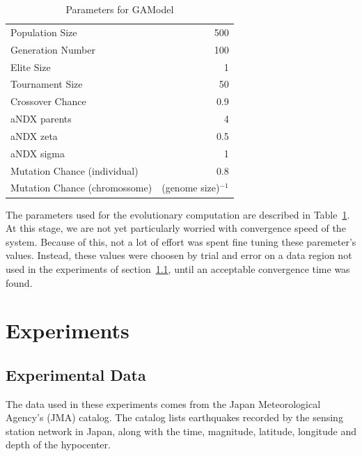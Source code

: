 \documentclass{sig-alternate}
\begin{document}
\begin{table}[!ht]
  \begin{center}
  \begin{tabular}{|l|r|}
    \hline
    Population Size & 500\\
    Generation Number & 100\\
    Elite Size & 1\\
    Tournament Size & 50\\
    Crossover Chance & 0.9\\
    aNDX parents & 4\\
    aNDX zeta & 0.5\\
    aNDX sigma & 1\\
    Mutation Chance (individual) & 0.8\\
    Mutation Chance (chromossome) & (genome size)$^{-1}$\\
    \hline    
  \end{tabular}
  \end{center}
  \caption{Parameters for GAModel}
  \label{GAParameters}
\end{table}

The parameters used for the evolutionary computation are described in
Table~\ref{GAParameters}. At this stage, we are not yet particularly
worried with convergence speed of the system. Because of this, not a
lot of effort was spent fine tuning these paremeter's values. Instead,
these values were choosen by trial and error on a data region not used
in the experiments of section~\ref{data}, until an acceptable
convergence time was found.


\section{Experiments}

\subsection{Experimental Data}\label{data}

The data used in these experiments comes from the Japan Meteorological
Agency's (JMA) catalog. The catalog lists earthquakes recorded by the
sensing station network in Japan, along with the time, magnitude,
latitude, longitude and depth of the hypocenter.
\end{document}
